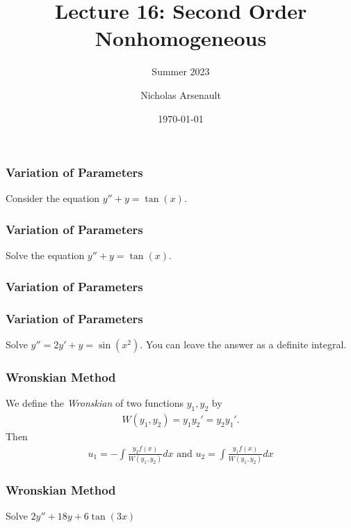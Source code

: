 \documentclass[aspectratio=169,xcolor=dvipsnames]{beamer}
\title[MA214]{Lecture 16: Second Order Nonhomogeneous} %
\subtitle{Summer 2023}
\author[Nicholas Arsenault] {Nicholas Arsenault}
\institute[UKY] %
{
    Department of Mathematics \\
    University of Kentucky %
}
\date{\today} %
\newcommand{\vsp}{\vspace{2in}}
\begin{document}
\begin{frame}
    \titlepage
\end{frame}
\begin{frame}
  \frametitle{Variation of Parameters}
  Consider the equation $y'' + y = \tan(x)$.
  \vspace{2in}
\end{frame}
\begin{frame}
  \frametitle{Variation of Parameters}
  \begin{example}
  Solve the equation $y'' + y = \tan(x)$.
  \end{example}
  \vspace{2in}
\end{frame}
\begin{frame}
  \frametitle{Variation of Parameters}
\end{frame}
\begin{frame}
  \frametitle{Variation of Parameters}
  \begin{example}
    Solve $y'' = 2y' + y = \sin(x^2)$. You can leave the answer as a definite integral.
  \end{example}
  \vsp
\end{frame}
\begin{frame}
  \frametitle{Wronskian Method}
  We define the \textit{Wronskian} of two functions $y_1,y_2$ by
  \begin{align*}
    W(y_1,y_2) = y_1y_2' = y_2y_1'.
  \end{align*}
  Then
  \begin{align*}
    u_1 = -\int \frac{y_2f(x)}{W(y_1,y_2)} dx \text{ and } u_2 = \int \frac{y_1f(x)}{W(y_1,y_2)}dx
  \end{align*}
\end{frame}
\begin{frame}
  \frametitle{Wronskian Method}
  \begin{example}
    Solve $2y'' + 18y + 6 \tan(3x)$
  \end{example}
  \vsp
\end{frame}
\end{document}
